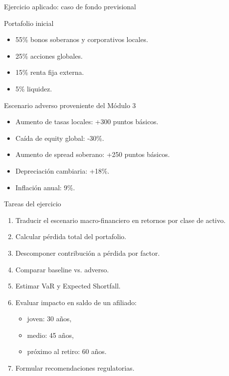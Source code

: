 \documentclass[aspectratio=169,11pt]{beamer}
\begin{document}
\begin{frame}{Ejercicio aplicado: caso de fondo previsional}
\begin{block}{Portafolio inicial}
\begin{itemize}
  \item 55\% bonos soberanos y corporativos locales.
  \item 25\% acciones globales.
  \item 15\% renta fija externa.
  \item 5\% liquidez.
\end{itemize}
\end{block}

\begin{alertblock}{Escenario adverso proveniente del Módulo 3}
\begin{itemize}
  \item Aumento de tasas locales: +300 puntos básicos.
  \item Caída de equity global: -30\%.
  \item Aumento de spread soberano: +250 puntos básicos.
  \item Depreciación cambiaria: +18\%.
  \item Inflación anual: 9\%.
\end{itemize}
\end{alertblock}
\end{frame}

\begin{frame}{Tareas del ejercicio}
\begin{enumerate}
  \item Traducir el escenario macro-financiero en retornos por clase de activo.
  \item Calcular pérdida total del portafolio.
  \item Descomponer contribución a pérdida por factor.
  \item Comparar baseline vs. adverso.
  \item Estimar VaR y Expected Shortfall.
  \item Evaluar impacto en saldo de un afiliado:
  \begin{itemize}
    \item joven: 30 años,
    \item medio: 45 años,
    \item próximo al retiro: 60 años.
  \end{itemize}
  \item Formular recomendaciones regulatorias.
\end{enumerate}
\end{frame}
\end{document}
